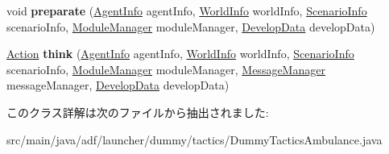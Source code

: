 \begin{DoxyCompactItemize}
\item 
\hypertarget{classadf_1_1launcher_1_1dummy_1_1tactics_1_1DummyTacticsAmbulance_afe5d0ed08352dbd161fcfcf065e39417}{}\label{classadf_1_1launcher_1_1dummy_1_1tactics_1_1DummyTacticsAmbulance_afe5d0ed08352dbd161fcfcf065e39417} 
void {\bfseries preparate} (\hyperlink{classadf_1_1agent_1_1info_1_1AgentInfo}{Agent\+Info} agent\+Info, \hyperlink{classadf_1_1agent_1_1info_1_1WorldInfo}{World\+Info} world\+Info, \hyperlink{classadf_1_1agent_1_1info_1_1ScenarioInfo}{Scenario\+Info} scenario\+Info, \hyperlink{classadf_1_1agent_1_1module_1_1ModuleManager}{Module\+Manager} module\+Manager, \hyperlink{classadf_1_1agent_1_1develop_1_1DevelopData}{Develop\+Data} develop\+Data)
\item 
\hypertarget{classadf_1_1launcher_1_1dummy_1_1tactics_1_1DummyTacticsAmbulance_a64caa7e1fee6348485753c247427777a}{}\label{classadf_1_1launcher_1_1dummy_1_1tactics_1_1DummyTacticsAmbulance_a64caa7e1fee6348485753c247427777a} 
\hyperlink{classadf_1_1agent_1_1action_1_1Action}{Action} {\bfseries think} (\hyperlink{classadf_1_1agent_1_1info_1_1AgentInfo}{Agent\+Info} agent\+Info, \hyperlink{classadf_1_1agent_1_1info_1_1WorldInfo}{World\+Info} world\+Info, \hyperlink{classadf_1_1agent_1_1info_1_1ScenarioInfo}{Scenario\+Info} scenario\+Info, \hyperlink{classadf_1_1agent_1_1module_1_1ModuleManager}{Module\+Manager} module\+Manager, \hyperlink{classadf_1_1agent_1_1communication_1_1MessageManager}{Message\+Manager} message\+Manager, \hyperlink{classadf_1_1agent_1_1develop_1_1DevelopData}{Develop\+Data} develop\+Data)
\end{DoxyCompactItemize}


このクラス詳解は次のファイルから抽出されました\+:\begin{DoxyCompactItemize}
\item 
src/main/java/adf/launcher/dummy/tactics/Dummy\+Tactics\+Ambulance.\+java\end{DoxyCompactItemize}
